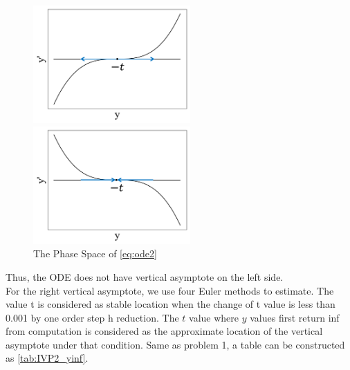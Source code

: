 \documentclass[a4paper]{article}
\begin{document}
    \begin{figure}[H]
       \subfigure 
    {
    	\begin{minipage}{8cm}
    	 \centering      
    		\includegraphics[width=6cm]{img/ivp2_phase_graph_1.png}
    	\end{minipage}
    }
      \subfigure 
    {
    	\begin{minipage}{8cm}
    	\centering      
    		\includegraphics[width=6cm]{img/ivp2_phase_graph_2.png}
    	\end{minipage}
    }
    \caption{\label{fig:ivp2_phase} The Phase Space of \autoref{eq:ode2}} 
    \end{figure}
    
    Thus, the ODE does not have vertical asymptote on the left side. \\

    For the right vertical asymptote, we use four Euler methods to estimate. The value t is considered as stable location when the change of t value is less than 0.001 by one order step h reduction. The $t$ value where $y$ values first return inf from computation is considered as the approximate location of the vertical asymptote under that condition. Same as problem 1, a table can be constructed as \autoref{tab:IVP2_yinf}.
    
\end{document}
